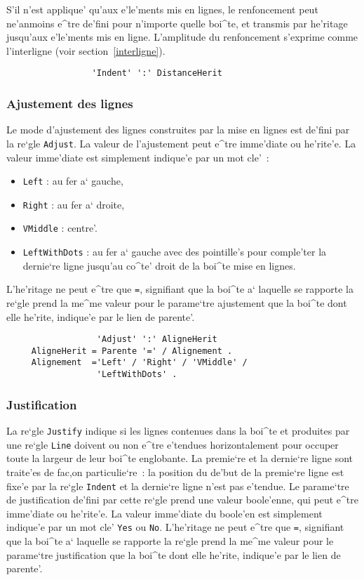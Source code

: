 {S'il n'est applique' qu'aux e'le'ments mis en lignes, le renfoncement peut
ne'anmoins e^tre de'fini pour n'importe quelle boi^te, et transmis par
he'ritage jusqu'aux e'le'ments mis en ligne. L'amplitude du renfoncement
s'exprime comme l'interligne (voir section~\ref{interligne}).

\begin{verbatim}
                 'Indent' ':' DistanceHerit
\end{verbatim}

\subsubsection{Ajustement des lignes}

Le mode d'ajustement des lignes construites par la mise en lignes est
de'fini par la re`gle {\tt Adjust}. La valeur de l'ajustement peut e^tre
imme'diate ou he'rite'e. La valeur imme'diate est simplement indique'e par
un mot cle'~:
\begin{itemize}
   \item {\tt Left} : au fer a` gauche,
   \item {\tt Right} : au fer a` droite,
   \item {\tt VMiddle} : centre'.
   \item {\tt LeftWithDots} : au fer a` gauche avec des pointille's pour
         comple'ter la dernie`re ligne jusqu'au co^te' droit de la boi^te
         mise en lignes.
\end{itemize}
L'he'ritage ne peut e^tre que {\tt =}, signifiant que la boi^te a` laquelle
se rapporte la re`gle prend la me^me valeur pour le parame`tre ajustement
que la boi^te dont elle he'rite, indique'e par le lien de parente'.

\begin{verbatim}
                  'Adjust' ':' AligneHerit
     AligneHerit = Parente '=' / Alignement .
     Alignement  ='Left' / 'Right' / 'VMiddle' /
                  'LeftWithDots' .
\end{verbatim}

\subsubsection{Justification}

La re`gle {\tt Justify} indique si les lignes contenues dans la boi^te et
produites par une re`gle {\tt Line} doivent ou non e^tre e'tendues
horizontalement pour occuper toute la largeur de leur boi^te englobante.
La premie`re et la dernie`re ligne sont traite'es de fac,on particulie`re~:
la position du de'but de la premie`re ligne est fixe'e par la re`gle {\tt Indent}
et la dernie`re ligne n'est pas e'tendue. Le parame`tre de justification de'fini
par cette re`gle prend une valeur boole'enne, qui peut e^tre imme'diate ou
he'rite'e. La valeur imme'diate du boole'en est simplement indique'e par un
mot cle' {\tt Yes} ou {\tt No}. L'he'ritage ne peut e^tre que {\tt =},
signifiant que la boi^te a` laquelle se rapporte la re`gle prend la me^me
valeur pour le parame`tre justification que la boi^te dont elle he'rite,
indique'e par le lien de parente'.

}
